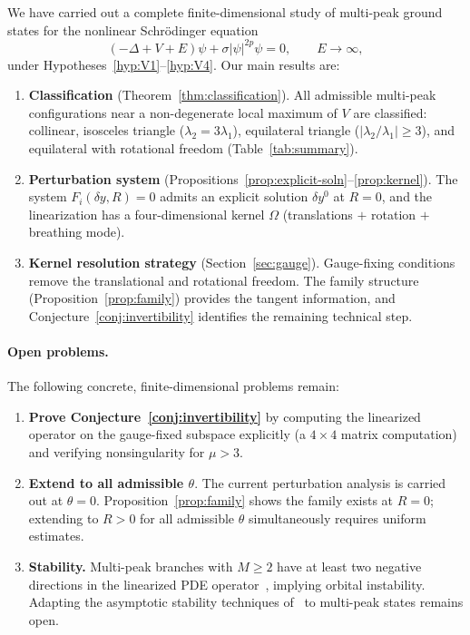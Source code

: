 \documentclass[11pt]{article}
\theoremstyle{plain}%
\theoremstyle{definition}%
\theoremstyle{definition}%
\theoremstyle{remark}%
\numberwithin{equation}{section}
\begin{document}
We have carried out a complete finite-dimensional study of multi-peak ground states for the nonlinear Schr\"odinger equation
\[
(-\Delta+V+E)\psi+\sigma|\psi|^{2p}\psi=0, \qquad E\to\infty,
\]
under Hypotheses~\ref{hyp:V1}--\ref{hyp:V4}. Our main results are:

\begin{enumerate}
\item \textbf{Classification} (Theorem~\ref{thm:classification}). All admissible multi-peak configurations near a non-degenerate local maximum of $V$ are classified: collinear, isosceles triangle ($\lambda_2=3\lambda_1$), equilateral triangle ($|\lambda_2/\lambda_1|\geq 3$), and equilateral with rotational freedom (Table~\ref{tab:summary}).

\item \textbf{Perturbation system} (Propositions~\ref{prop:explicit-soln}--\ref{prop:kernel}). The system $F_i(\delta y,R)=0$ admits an explicit solution $\delta y^0$ at $R=0$, and the linearization has a four-dimensional kernel $\Omega$ (translations $+$ rotation $+$ breathing mode).

\item \textbf{Kernel resolution strategy} (Section~\ref{sec:gauge}). Gauge-fixing conditions remove the translational and rotational freedom. The family structure (Proposition~\ref{prop:family}) provides the tangent information, and Conjecture~\ref{conj:invertibility} identifies the remaining technical step.
\end{enumerate}

\paragraph{Open problems.} The following concrete, finite-dimensional problems remain:

\begin{enumerate}
\item \textbf{Prove Conjecture~\ref{conj:invertibility}} by computing the linearized operator on the gauge-fixed subspace explicitly (a $4\times 4$ matrix computation) and verifying nonsingularity for $\mu>3$.

\item \textbf{Extend to all admissible $\theta$}. The current perturbation analysis is carried out at $\theta=0$. Proposition~\ref{prop:family} shows the family exists at $R=0$; extending to $R>0$ for all admissible $\theta$ simultaneously requires uniform estimates.

\item \textbf{Stability.} Multi-peak branches with $M\geq 2$ have at least two negative directions in the linearized PDE operator~\cite{GrillakisShatahStrauss1987}, implying orbital instability. Adapting the asymptotic stability techniques of~\cite{KirrZarnescu2007,KirrMizrak2008,Kirr2016} to multi-peak states remains open.
\end{enumerate}
\end{document}
